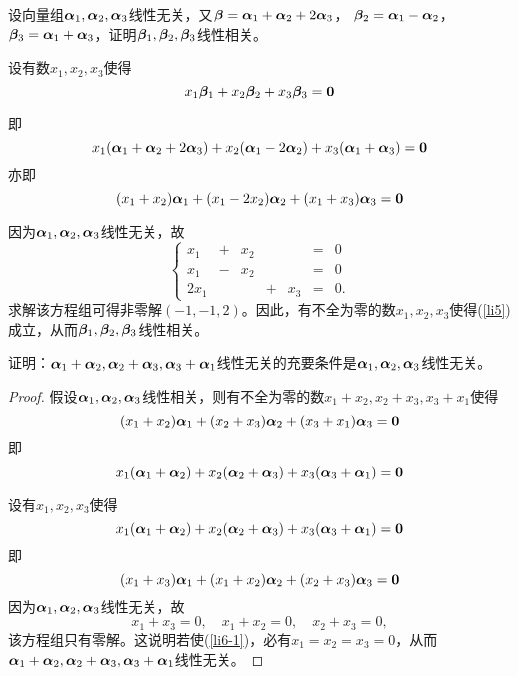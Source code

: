 \begin{li}
  设向量组$\alphabd_1,\alphabd_2,\alphabd_3$线性无关，又$\betabd=\alphabd_1+\alphabd_2+2\alphabd_3$，
  $\betabd_2=\alphabd_1-\alphabd_2$，$\betabd_3=\alphabd_1+\alphabd_3$，证明$\betabd_1,\betabd_2,\betabd_3$线性相关。       
\end{li}
\begin{jie}
设有数$x_1,x_2,x_3$使得
\begin{equation}\label{li5}
  x_1\betabd_1+x_2\betabd_2+x_3\betabd_3=\zero
\end{equation}    

即
$$
x_1(\alphabd_1+\alphabd_2+2\alphabd_3)+x_2(\alphabd_1-2\alphabd_2)+x_3(\alphabd_1+\alphabd_3)=\zero
$$
亦即
$$
(x_1+x_2)\alphabd_1+(x_1-2x_2)\alphabd_2+(x_1+x_3)\alphabd_3=\zero
$$

因为$\alphabd_1,\alphabd_2,\alphabd_3$线性无关，故
$$
\left\{
\begin{array}{rcrcrcrcr}
  x_1&+&x_2&&&=&0\\
  x_1&-&x_2&&&=&0\\
  2x_1&&&+&x_3&=&0.
\end{array}
\right.
$$
求解该方程组可得非零解$(-1,-1,2)$。因此，有不全为零的数$x_1,x_2,x_3$使得(\ref{li5})成立，从而$\betabd_1,\betabd_2,\betabd_3$线性相关。

\end{jie}

\begin{li}
  证明：$\alphabd_1+\alphabd_2,\alphabd_2+\alphabd_3,\alphabd_3+\alphabd_1$线性无关的充要条件是$\alphabd_1,\alphabd_2,\alphabd_3$线性无关。
\end{li}
\begin{proof}
\red{($\Rightarrow$)} \quad
假设$\alphabd_1,\alphabd_2,\alphabd_3$线性相关，则有不全为零的数$x_1+x_2,x_2+x_3,x_3+x_1$使得
$$
(x_1+x_2)\alphabd_1+(x_2+x_3)\alphabd_2+(x_3+x_1)\alphabd_3=\zero
$$
即
$$
x_1(\alphabd_1+\alphabd_2)+x_2(\alphabd_2+\alphabd_3)+x_3(\alphabd_3+\alphabd_1)=\zero
$$

\vspace{0.1in}

\red{($\Leftarrow$)} \quad
设有$x_1,x_2,x_3$使得
\begin{equation}\label{li6-1}
  x_1(\alphabd_1+\alphabd_2)+x_2(\alphabd_2+\alphabd_3)+x_3(\alphabd_3+\alphabd_1)=\zero
\end{equation}
即
$$
(x_1+x_3)\alphabd_1+(x_1+x_2)\alphabd_2+(x_2+x_3)\alphabd_3=\zero
$$
因为$\alphabd_1,\alphabd_2,\alphabd_3$线性无关，故
$$
x_1+x_3=0, \quad x_1+x_2=0, \quad x_2+x_3=0,
$$
该方程组只有零解。这说明若使(\ref{li6-1})，必有$x_1=x_2=x_3=0$，从而$\alphabd_1+\alphabd_2,\alphabd_2+\alphabd_3,\alphabd_3+\alphabd_1$线性无关。

\end{proof}


